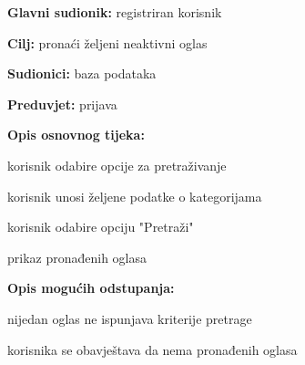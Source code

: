 					\noindent {}
					\begin{packed_item}
						
						\item \textbf{Glavni sudionik: } registriran korisnik
						\item  \textbf{Cilj:} pronaći željeni neaktivni oglas
						\item  \textbf{Sudionici:} baza podataka
						\item  \textbf{Preduvjet:} prijava
						\item  \textbf{Opis osnovnog tijeka:}
						
						\item[] \begin{packed_enum}
							
							\item korisnik odabire opcije za pretraživanje
							\item korisnik unosi željene podatke o kategorijama
							\item korisnik odabire opciju "Pretraži"
							\item prikaz pronađenih oglasa
						\end{packed_enum}
						
						\item  \textbf{Opis mogućih odstupanja:}
						
						\item[] \begin{packed_item}
							
							\item[3.a] nijedan oglas ne ispunjava kriterije pretrage
							\item[] \begin{packed_enum}
								\item korisnika se obavještava da nema pronađenih oglasa
							\end{packed_enum}
							
						\end{packed_item}
					\end{packed_item}
					
